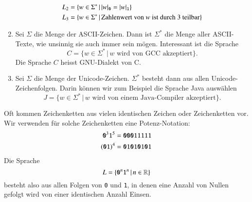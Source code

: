 \begin{enumerate}
\begin{align*}
L_2&=\{ w\in\Sigma^*\,|\, |w|_{\tt 0}=|w|_{\tt 1}\}\\
L_3&=\{ w\in\Sigma^*\,|\, \text{Zahlenwert von $w$ ist durch 3 teilbar}\}
\end{align*}
\item Sei $\Sigma$ die Menge der ASCII-Zeichen. Dann ist $\Sigma^*$ die
Menge aller ASCII-Texte, wie unsinnig sie auch immer sein mögen. Interessant
ist die Sprache
\[
C=\{w\in\Sigma^*\,|\,\text{$w$ wird von GCC akzeptiert}\}.
\]
Die Sprache $C$ heisst GNU-Dialekt von C.
\item Sei $\Sigma$ die Menge der Unicode-Zeichen. $\Sigma^*$ besteht
dann aus allen Unicode-Zeichenfolgen. Darin können wir zum Beispiel die
Sprache Java auswählen
\[
J
=\{w\in\Sigma^*\,|\, {\text{$w$ wird von einem Java-Compiler akzeptiert}}\}.
\]
\end{enumerate}

Oft kommen Zeichenketten aus vielen identischen Zeichen oder Zeichenketten vor.
Wir verwenden für solche Zeichenketten eine Potenz-Notation:
\begin{align*}
{\tt 0}^3{\tt 1}^5&={\tt 00011111}\\
({\tt 01})^4&={\tt 01010101}
\end{align*}
Die Sprache
\[
L=\{ {\tt 0}^n{\tt 1}^n\,|\,n\in\mathbb R\}
\]
besteht also aus allen Folgen von {\tt 0} und {\tt 1}, in denen eine Anzahl
von Nullen gefolgt wird von einer identischen Anzahl Einsen.
